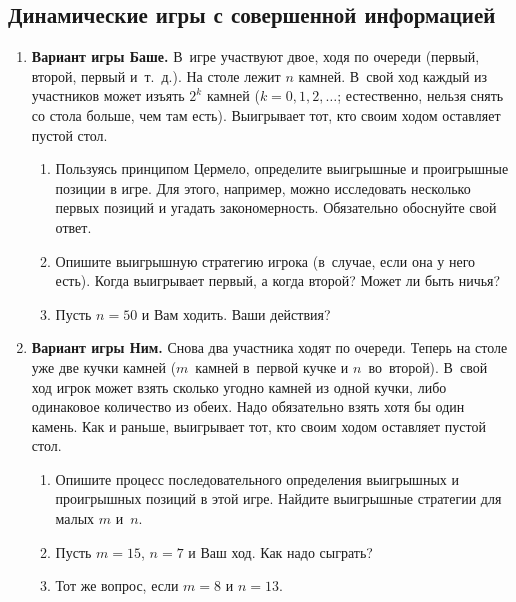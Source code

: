 \documentclass[a4paper,12pt]{article}
\begin{document}
\subsection{Динамические игры с совершенной информацией}

\begin{enumerate}

\item {\bf Вариант игры Баше.} В~игре участвуют двое, ходя
по очереди (первый, второй, первый и~т.~д.). На столе лежит
$n$ камней. В~свой ход каждый из участников может изъять
$2^k$ камней ($k=0,1,2,\ldots$; естественно, нельзя снять
со стола больше, чем там есть). Выигрывает тот, кто своим
ходом оставляет пустой стол.

\begin{enumerate}

\item Пользуясь принципом Цермело, определите выигрышные и
проигрышные позиции в игре. Для этого, например, можно
исследовать несколько первых позиций и угадать
закономерность. Обязательно обоснуйте свой ответ.

\item Опишите выигрышную стратегию игрока (в~случае, если
она у него есть). Когда выигрывает первый, а когда второй?
Может ли быть ничья?

\item Пусть $n=50$ и Вам ходить. Ваши действия?

\end{enumerate}

\bigskip

\item {\bf Вариант игры Ним.} Снова два участника ходят по
очереди. Теперь на столе уже две кучки камней ($m$~камней
в~первой кучке и $n$~во~второй). В~свой ход игрок может
взять сколько угодно камней из одной кучки, либо одинаковое
количество из обеих. Надо обязательно взять хотя бы один
камень. Как и раньше, выигрывает тот, кто своим ходом
оставляет пустой стол.

\begin{enumerate}

\item  Опишите процесс последовательного определения
выигрышных и проигрышных позиций в этой игре. Найдите
выигрышные стратегии для малых $m$ и~$n$.

\item Пусть $m=15$, $n=7$ и Ваш ход. Как надо сыграть?

\item Тот же вопрос, если $m=8$ и $n=13$.


\end{enumerate}
\end{enumerate}
\end{document}
